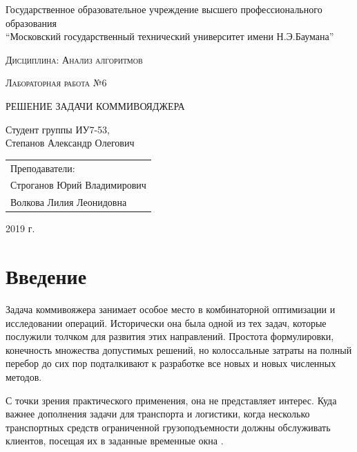 \documentclass[a4paper,12pt]{article}
\newcommand{\anonsection}[1]{\section*{#1}\addcontentsline{toc}{section}{#1}}
\begin{document}
\begin{titlepage}

    \begin{center}
        \large
        Государственное образовательное учреждение высшего профессионального образования\\
        “Московский государственный технический университет имени Н.Э.Баумана”
        \vspace{3cm}

        \textsc{Дисциплина: Анализ алгоритмов}
        \vspace{0.5cm}

        \textsc{Лабораторная работа №6}
        \vspace{3cm}

        {\LARGE РЕШЕНИЕ ЗАДАЧИ КОММИВОЯДЖЕРА}
        \vspace{3cm}

        Студент группы ИУ7-53,\\
        Степанов Александр Олегович
        \vfill
    \end{center}

    \begin{flushright}
        \begin{tabular}{l}
            Преподаватели:\\
            Строганов Юрий Владимирович\\
            Волкова Лилия Леонидовна
        \end{tabular}
    \end{flushright}

    \begin{center}

        2019 г.

    \end{center}

\end{titlepage}

\tableofcontents

\newpage
\anonsection{Введение}

Задача коммивояжера занимает особое место в комбинаторной оптимизации и исследовании операций.
Исторически она была одной из тех задач, которые послужили толчком для развития этих направлений.
Простота формулировки, конечность множества допустимых решений, но колоссальные затраты на полный
перебор до сих пор подталкивают к разработке все новых и новых численных методов.

С точки зрения практического применения, она не представляет интерес.
Куда важнее дополнения задачи для транспорта и логистики, когда несколько
транспортных средств ограниченной грузоподъемности должны обслуживать клиентов,
посещая их в заданные временные окна \cite{kommivoyadjer}.
\end{document}
